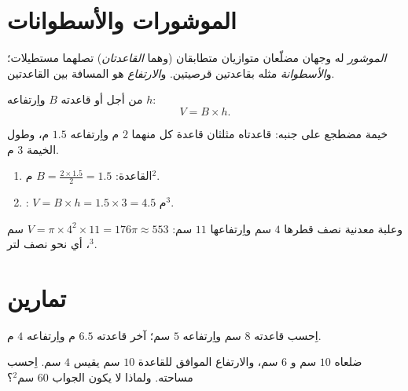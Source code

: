 \section{الموشورات والأسطوانات}

\begin{definition}\label{def:g7:areas:prism}
\emph{الموشور}  له وجهان مضلّعان متوازيان
متطابقان (وهما \emph{القاعدتان}) تصلهما مستطيلات؛
و\emph{الأسطوانة} مثله بقاعدتين قرصيتين.
و\emph{الارتفاع} هو المسافة بين القاعدتين.
\end{definition}

\begin{theorem}[الأحجام]\label{thm:g7:areas:volume}
من أجل  أو   قاعدته $B$ واِرتفاعه $h$:
\[
V = B \times h .
\]
\end{theorem}
\admitted

\begin{example}\label{ex:g7:areas:volume}
خيمة  مضطجع على جنبه: قاعدتاه مثلثان قاعدة كل منهما
$2$ م واِرتفاعه $1.5$ م، وطول الخيمة $3$ م.
\begin{enumerate}
  \item {} القاعدة: $B = \frac{2 \times 1.5}{2} = 1.5$ م$^2$.
  \item {}: $V = B \times h = 1.5 \times 3 = 4.5$ م$^3$.
\end{enumerate}
وعلبة معدنية نصف قطرها $4$ سم واِرتفاعها $11$ سم:
$V = \pi \times 4^2 \times 11 = 176\pi \approx 553$ سم$^3$، أي نحو
نصف لتر.
\end{example}

\section{تمارين}

\begin{exercise}[$\star$]\label{exo:g7:areas:1}
اِحسب   قاعدته $8$ سم واِرتفاعه
$5$ سم؛  آخر قاعدته $6.5$ م واِرتفاعه $4$ م.
\end{exercise}

\begin{exercise}[$\star$]\label{exo:g7:areas:2}
 ضلعاه $10$ سم و $6$ سم، والارتفاع الموافق
للقاعدة $10$ سم يقيس $4$ سم. اِحسب مساحته. ولماذا لا يكون
الجواب $60$ سم$^2$؟
\end{exercise}


